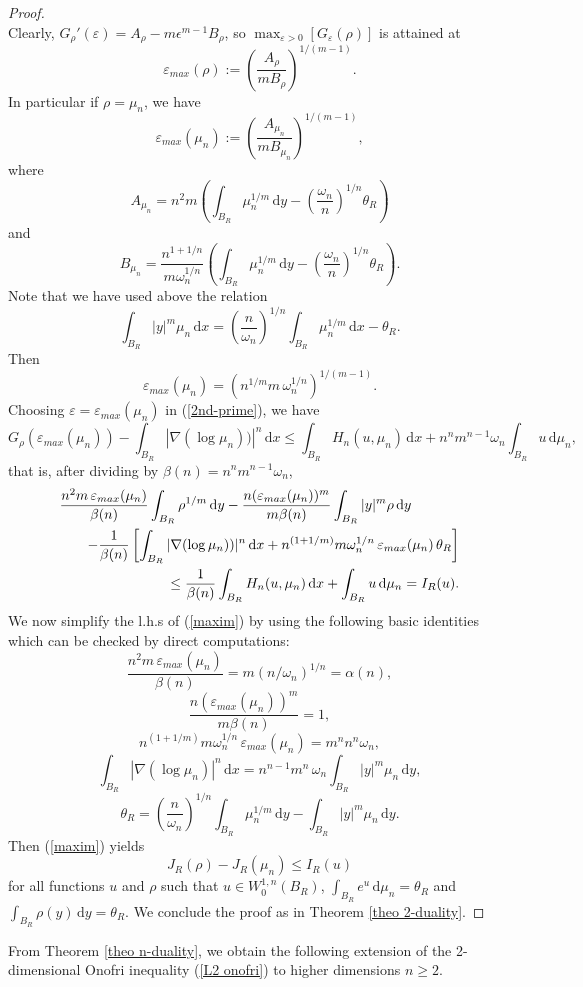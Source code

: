 \documentclass[10pt]{article}
\numberwithin{equation}{section}
\theoremstyle{plain}
\theoremstyle{definition}
\theoremstyle{remark}
\newcommand{\ib}{\int_{B_R}}
\newcommand\vep{\varepsilon}
\newcommand\dd{\,\mbox{d} }
\begin{document}
\begin{proof}
\begin{equation}
\end{equation}
Clearly, $G_\rho'(\vep) = A_\rho-m\epsilon^{m-1}B_\rho$, so $\max_{\vep>0}  \left[G_\vep(\rho)\right]$ is attained at 
\begin{equation}\label{eqn1.4}
\vep_{max}(\rho) := \left(\frac{A_\rho}{mB_\rho}\right)^{1/(m-1)}.
\end{equation}
In particular if $\rho=\mu_n$, we have
\[\vep_{max}(\mu_n) := \left(\frac{A_{\mu_n}}{mB_{\mu_n}}\right)^{1/(m-1)},\]
where 
\[A_{\mu_n}=n^2m\left(\ib \mu_n^{1/m}\dd y -\left(\frac{\omega_n}{n}\right)^{1/n}\theta_R\right)\]
and
\[B_{\mu_n}=\frac{n^{1+1/n}}{m\omega_n^{1/n}} \left(\ib \mu_n^{1/m}\dd y -\left(\frac{\omega_n}{n}\right)^{1/n}\theta_R\right).\]
Note that we have used above the relation
\begin{equation}\label{new relation}
\ib |y|^m\mu_n \dd x = \left(\frac{n}{\omega_n}\right)^{1/n} \ib \mu_n^{1/m}\dd x - \theta_R.
\end{equation}
Then
\begin{equation}\label{eqn1.5}
\vep_{max}(\mu_n) = (n^{1/m} m\,\omega_n^{1/n})^{1/(m-1)}.
\end{equation}
Choosing $\vep=\vep_{max}(\mu_n)$ in (\ref{2nd-prime}), we have
\[G_\rho\left(\vep_{max}(\mu_n)\right)  - \ib |\nabla(\log\mu_n))|^n\dd x \leq \ib H_n(u,\mu_n) \dd x + n^nm^{n-1}\omega_n\ib u\dd\mu_n,\]
that is, after dividing by $\beta(n)=n^nm^{n-1}\omega_n$,
\begin{eqnarray}\label{maxim}
\lefteqn{\frac{n^2m\,\vep_{max}(\mu_n)}{\beta(n)} \ib \rho^{1/m}\dd y  -\frac{n(\vep_{max}(\mu_n))^m}{m\beta(n)}  \int_{B_R}|y|^m\rho \dd y} \nonumber \\
& & \quad -\frac{1}{\beta(n)} \left[ \ib |\nabla(\log\mu_n))|^n\dd x +  n^{(1+1/m)}m\omega_n^{1/n}\,\vep_{max}(\mu_n)\, \theta_R\right] \nonumber \\
& & \leq \frac{1}{\beta(n)}\ib H_n(u,\mu_n) \dd x + \ib u\dd\mu_n = I_R(u).
\end{eqnarray}
We now simplify the l.h.s of (\ref{maxim}) by using the following basic identities which can be  checked by direct computations:
\[\frac{n^2m\,\vep_{max}(\mu_n)}{\beta(n)} = m(n/\omega_n)^{1/n} =\alpha(n), 
\]
\[\frac{n(\vep_{max}(\mu_n))^m}{m\beta(n)} = 1,\]
\[
 n^{(1+1/m)}m\omega_n^{1/n}\,\vep_{max}(\mu_n) = m^n n^n\omega_n, \]
\[\ib |\nabla(\log\mu_n)|^n\dd x = n^{n-1}m^n\, \omega_n \ib |y|^m\mu_n \dd y,\]
\[\theta_R = \left(\frac{n}{\omega_n}\right)^{1/n} \ib \mu_n^{1/m}\dd y - \ib |y|^m\mu_n \dd y.\]
Then (\ref{maxim}) yields
\[J_R(\rho) - J_R(\mu_n) \leq I_R(u)\]
for all functions $u$ and $\rho$ such that $u\in W^{1,n}_0(B_R)$, $\ib e^u\dd\mu_n = \theta_R$ and $\ib \rho(y) \dd y =\theta_R$.
We conclude the proof as in  Theorem  \ref{theo 2-duality}.
\end{proof}
From Theorem  \ref{theo n-duality}, we obtain the following extension of the 2-dimensional Onofri inequality (\ref{L2 onofri}) to higher dimensions $n\geq 2$.
\end{document}
